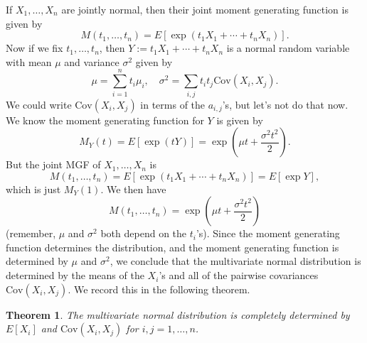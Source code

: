 \documentclass[12pt]{article}
\theoremstyle{plain}
\newtheorem{theorem}{Theorem}[section]
\theoremstyle{definition}
\theoremstyle{remark}
\newcommand{\Cov}{\ensuremath{\textrm{Cov}}}
\begin{document}
If $X_1, \ldots, X_n$ are jointly normal, then their joint moment generating function is given by
\[
    M(t_1, \ldots, t_n) = E[\exp(t_1X_1 + \cdots + t_nX_n)].
\]
Now if we fix $t_1, \ldots, t_n$, then $Y:= t_1X_1 + \cdots + t_nX_n$ is a normal random variable with mean $\mu$ and variance $\sigma^2$ given by
\[
    \mu = \sum_{i=1}^nt_i\mu_i,\quad \sigma^2 = \sum_{i,j}t_it_j\Cov(X_i,X_j).
\]
We could write $\Cov(X_i,X_j)$ in terms of the $a_{i,j}$'s, but let's not do that now.
We know the moment generating function for $Y$ is given by
\[
    M_Y(t) = E[\exp(tY)] =  \exp\left(\mu t + \frac{\sigma^2t^2}{2}\right).
\]
But the joint MGF of $X_1, \ldots, X_n$ is
\[
    M(t_1, \ldots, t_n) = E[\exp(t_1X_1 + \cdots + t_nX_n)] = E[\exp Y],
\]
which is just $M_Y(1)$.
We then have
\[
    M(t_1, \ldots, t_n) = \exp\left(\mu t + \frac{\sigma^2t^2}{2}\right)
\]
(remember, $\mu$ and $\sigma^2$ both depend on the $t_i$'s).
Since the moment generating function determines the distribution, and the moment generating function is determined by $\mu$ and $\sigma^2$, we conclude that the multivariate normal distribution is determined by the means of the $X_i$'s and all of the pairwise covariances $\Cov(X_i, X_j)$.
We record this in the following theorem.
\begin{theorem}
    The multivariate normal distribution is completely determined by $E[X_i]$ and $\Cov(X_i, X_j)$ for $i,j = 1, \ldots, n$.
\end{theorem}
\end{document}
